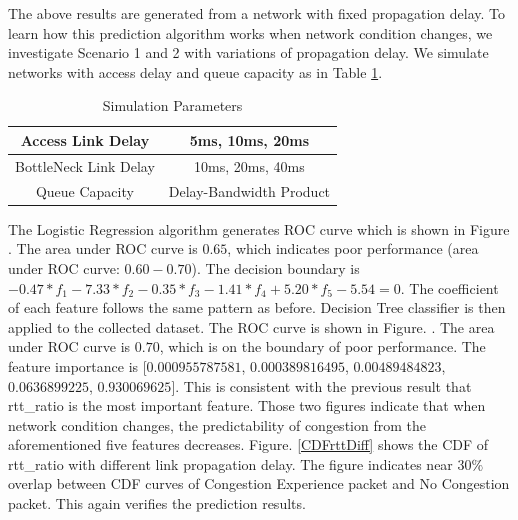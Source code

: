 \par The above results are generated from a network with fixed propagation delay. To learn how this prediction algorithm works when network condition changes, we investigate Scenario 1 and 2 with variations of propagation delay. We simulate networks with access delay and queue capacity as in Table \ref{tab:varyRTT}.
\begin{table}
\begin{center}
\caption {Simulation Parameters} \label{tab:varyRTT}
\begin{tabular}{ |c|c| }
 \hline
 Access Link Delay & 5ms, 10ms, 20ms  \\
 \hline
 BottleNeck Link Delay & 10ms, 20ms, 40ms\\
 \hline
 Queue Capacity & Delay-Bandwidth Product\\
 \hline
\end{tabular}
\end{center}
\end{table}
The Logistic Regression algorithm generates ROC curve which is shown in Figure . The area under ROC curve is $0.65$, which indicates poor performance (area under ROC curve: $0.60-0.70$). The decision boundary is $ -0.47*f_{1} - 7.33*f_{2} - 0.35
*f_{3} - 1.41*f_{4} + 5.20*f_{5} - 5.54 = 0$. The coefficient of each feature follows the same pattern as before. Decision Tree classifier is then applied to the collected dataset. The ROC curve is shown in Figure. . The area under ROC curve is $0.70$, which is on the boundary of poor performance. The feature importance is [$0.000955787581$, $0.000389816495$, $0.00489484823$, $0.0636899225$, $0.930069625$]. This is consistent with the previous result that rtt\_ratio is the most important feature. Those two figures indicate that when network condition changes, the predictability of congestion from the aforementioned five features decreases. Figure. \ref{CDFrttDiff} shows the CDF of rtt\_ratio with different link propagation delay. The figure indicates near $30\%$ overlap between CDF curves of Congestion Experience packet and No Congestion packet. This again verifies the prediction results.
